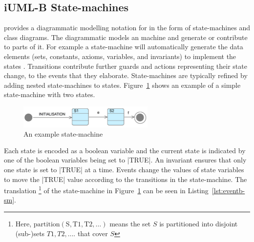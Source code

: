 
\subsection{iUML-B State-machines}
\label{sec:iumlb}

\iUMLB provides a diagrammatic modelling notation for \EventB in the form of state-machines and class diagrams. 
The diagrammatic models  an \EventB machine and generate or contribute to parts of it. 
For example a state-machine will automatically generate the \EventB data elements (sets, constants, axioms, variables, and invariants) to implement the states . 
Transitions contribute further guards and actions representing their state change, to the events that they elaborate.  
State-machines are typically refined by adding nested state-machines to states.
Figure~\ref{fig:iumlb-sm} shows an example of a simple state-machine with two states.
\begin{figure}[!h]
	\vspace{-.5cm}
	\centering
	\includegraphics[width=0.6\textwidth]{figures/iumlb-SM}
	\caption{An example \iUMLB state-machine}
	\label{fig:iumlb-sm}
	\vspace{-.5cm}
\end{figure}

Each state is encoded as a boolean variable and the current state is indicated by one of the boolean variables being set to |TRUE|. 
An invariant ensures that only one state is set to |TRUE| at a time.
Events change the values of state variables to move the |TRUE| value according to the transitions in the state-machine.  
The \EventB translation%
%
\footnote{%
  Here, $\mathrm{partition(S, T1, T2, \ldots)}$ means the set $S$ is partitioned into disjoint (sub-)sets $T1, T2, \ldots$.
that cover $S$} %
of the state-machine in Figure~\ref{fig:iumlb-sm} can be seen in Listing~\ref{lst:eventb-sm}.%
	
